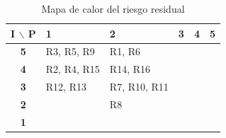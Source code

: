 \documentclass[conference]{IEEEtran}
\newcommand{\B}{\cellcolor{rbajo}}
\newcommand{\M}{\cellcolor{rmedio}}
\newcommand{\A}{\cellcolor{ralto}}
\newcommand{\C}{\cellcolor{rcritico}}
\renewcommand{\arraystretch}{1.15}
\begin{document}
\begin{table}[!htb]
\caption{Mapa de calor del riesgo residual}
\label{tab:calor2}
\centering
\footnotesize
\setlength{\tabcolsep}{2pt}
\renewcommand{\arraystretch}{1.5}
\begin{tabular}{|c|>{\centering\arraybackslash}p{1.25cm}|>{\centering\arraybackslash}p{1.25cm}|>{\centering\arraybackslash}p{1.25cm}|>{\centering\arraybackslash}p{1.25cm}|>{\centering\arraybackslash}p{1.25cm}|}
\hline
\textbf{I $\backslash$ P} & \textbf{1} & \textbf{2} & \textbf{3} & \textbf{4} & \textbf{5} \\
\hline
\textbf{5}\rule[-2.4ex]{0pt}{6ex} & \M R3, R5, R9 & \A R1, R6 & \A & \C & \C \\
\hline
\textbf{4}\rule[-2.4ex]{0pt}{6ex} & \B R2, R4, R15 & \M R14, R16 & \A & \C & \C \\
\hline
\textbf{3}\rule[-2.4ex]{0pt}{6ex} & \B R12, R13 & \M R7, R10, R11 & \M & \A & \A \\
\hline
\textbf{2}\rule[-2.4ex]{0pt}{6ex} & \B & \B R8 & \M & \M & \A \\
\hline
\textbf{1}\rule[-2.4ex]{0pt}{6ex} & \B & \B & \B & \B & \M \\
\hline
\end{tabular}

\end{table}
\end{document}
